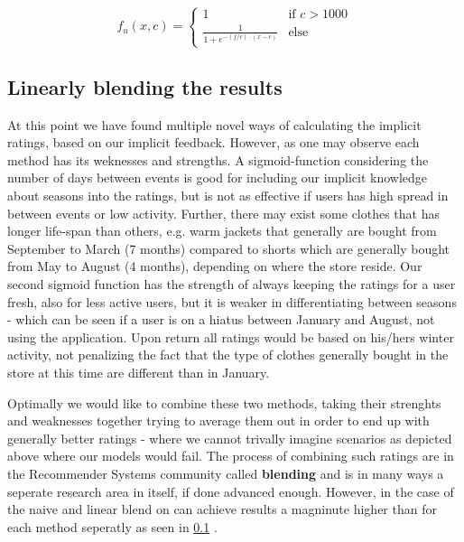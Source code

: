 \begin{equation}
  f_{u}(x, c) =
    \begin{cases}
      1               & \text{if } c > 1000 \\
      \frac{1}{1+e^{-(f/c) \cdot (x - c)}} & \text{else }
    \end{cases}
\end{equation}

\subsection{Linearly blending the results}

At this point we have found multiple novel ways of calculating the
implicit ratings, based on our implicit feedback. However, as one may observe
each method has its weknesses and strengths. A sigmoid-function considering the
number of days between events is good for including our implicit knowledge
about seasons into the ratings, but is not as effective if users has high
spread in between events or low activity. Further, there may exist some clothes
that has longer life-span than others, e.g. warm jackets that generally are
bought from September to March (7 months) compared to shorts which are
generally bought from May to August (4 months), depending on where the store
reside. Our second sigmoid function has the strength of always keeping the
ratings for a user fresh, also for less active users, but it is weaker in
differentiating between seasons - which can be seen if a user is on a hiatus
between January and August, not using the application. Upon return all ratings
would be based on his/hers winter activity, not penalizing the fact that the
type of clothes generally bought in the store at this time are different than
in January.

Optimally we would like to combine these two methods, taking their strenghts
and weaknesses together trying to average them out in order to end up with
generally better ratings - where we cannot trivally imagine scenarios as
depicted above where our models would fail. The process of combining such
ratings are in the Recommender Systems community called \textbf{blending} and
is in many ways a seperate research area in itself, if done advanced enough.
However, in the case of the naive and linear blend on can achieve results a
magninute higher than for each method seperatly as seen in \ref{}
.

